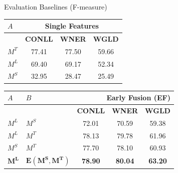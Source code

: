 \documentclass[10pt,=table]{beamer}
\newcommand\mlex{M^{\scriptscriptstyle L}}
\newcommand\msyn{M^{\scriptscriptstyle S}}
\newcommand\mstd{M^{\scriptscriptstyle T}}
\begin{document}
\begin{frame}[t]{Evaluation Baselines (F-measure)}
	\begin{minipage}[c][.8\textheight][c]{\linewidth}
		\begin{table}[!tbp]
		\centering
		\begin{tabular}{@{}lccc@{}}
		\toprule
		$A$                           & \multicolumn{3}{c}{\textbf{Single Features}} \\ \midrule
		                & \textbf{CONLL}    & \textbf{WNER}     & \textbf{WGLD}    \\ \cmidrule{2-4}
		$\mstd$                        & 77.41    & 77.50    & 59.66   \\
		$\mlex$                       & 69.40    & 69.17    & 52.34   \\
		$\msyn$                        & 32.95    & 28.47    & 25.49   \\
		 \bottomrule
		\end{tabular}
		\end{table}
		\begin{table}
		\centering
		\begin{tabular}{@{}llccc@{}}
				\toprule
				    $A$      &    $B$       & \multicolumn{3}{r}{\textbf{Early Fusion (EF)} }                                            \\ \midrule
				          &           & \textbf{CONLL}                      & \textbf{WNER}                      & \textbf{WGLD}                      \\ \cmidrule{3-5}
				          
				$\mlex$ & $\msyn$ & 72.01                      & 70.59                     & 59.38                     \\
				$\mlex$ & $\mstd$ & 78.13                      & 79.78                     & 61.96                     \\
				$\msyn$ & $\mstd$ & 77.70                      & 78.10                     & 60.93                     \\
				\rowcolor{orangeEric}
				$\mathbf{\mlex}$ & $\mathbf{E(M^S, M^T)}$ & \textbf{78.90}                      & \textbf{80.04}                     & \textbf{63.20}                   \\ \bottomrule
		\end{tabular}
		\end{table}
	\end{minipage}
\end{frame}
\end{document}
